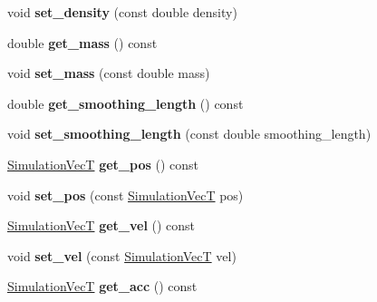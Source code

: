 \begin{DoxyCompactItemize}
\mbox{\label{classwash_1_1Particle_a6416678dd509c16c2933d315b6ae6156}} 
void {\bfseries set\+\_\+density} (const double density)
\item 
\mbox{\label{classwash_1_1Particle_a7d8d11b3e4855e66e62ee58b4270cdc1}} 
double {\bfseries get\+\_\+mass} () const
\item 
\mbox{\label{classwash_1_1Particle_a9151ed34c880f63f062381076834223e}} 
void {\bfseries set\+\_\+mass} (const double mass)
\item 
\mbox{\label{classwash_1_1Particle_aab02f56502c6521382cf7a7320abc341}} 
double {\bfseries get\+\_\+smoothing\+\_\+length} () const
\item 
\mbox{\label{classwash_1_1Particle_a15892a4346c05de955f91087dc88786d}} 
void {\bfseries set\+\_\+smoothing\+\_\+length} (const double smoothing\+\_\+length)
\item 
\mbox{\label{classwash_1_1Particle_a9d222d453d640cf629ee8dfbee6b43c2}} 
\mbox{\hyperlink{classwash_1_1Vec}{Simulation\+VecT}} {\bfseries get\+\_\+pos} () const
\item 
\mbox{\label{classwash_1_1Particle_af06835533935c04e594c258a7dcdd1ef}} 
void {\bfseries set\+\_\+pos} (const \mbox{\hyperlink{classwash_1_1Vec}{Simulation\+VecT}} pos)
\item 
\mbox{\label{classwash_1_1Particle_a890d0f1467225393e385872b0c98b974}} 
\mbox{\hyperlink{classwash_1_1Vec}{Simulation\+VecT}} {\bfseries get\+\_\+vel} () const
\item 
\mbox{\label{classwash_1_1Particle_a4755365883cfd62117ebe74fe44d35e0}} 
void {\bfseries set\+\_\+vel} (const \mbox{\hyperlink{classwash_1_1Vec}{Simulation\+VecT}} vel)
\item 
\mbox{\label{classwash_1_1Particle_afb8c9dce2692cdfab61a3a87fde50610}} 
\mbox{\hyperlink{classwash_1_1Vec}{Simulation\+VecT}} {\bfseries get\+\_\+acc} () const
\item 

\end{DoxyCompactItemize}
